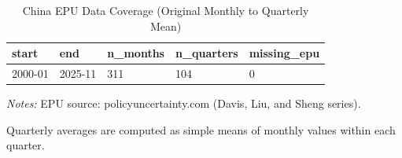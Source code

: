 \begin{table}[!htbp]
\centering
\small
\caption{China EPU Data Coverage (Original Monthly to Quarterly Mean)}
\label{tab:epu_coverage}
\begin{threeparttable}
\begin{tabular}{@{}lllll@{}}
\toprule
start & end & n_months & n_quarters & missing_epu \\
\midrule
2000-01 & 2025-11 & 311 & 104 & 0 \\
\bottomrule
\end{tabular}
\begin{tablenotes}[flushleft]
\footnotesize
\item \textit{Notes:} EPU source: policyuncertainty.com (Davis, Liu, and Sheng series).
\item Quarterly averages are computed as simple means of monthly values within each quarter.
\end{tablenotes}
\end{threeparttable}
\end{table}
